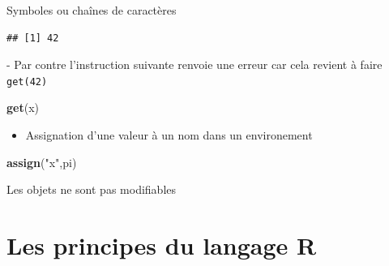 \documentclass[
  ignorenonframetext,
]{beamer}
\newenvironment{Shaded}{\begin{snugshade}}{\end{snugshade}}
\newcommand{\FunctionTok}[1]{\textcolor[rgb]{0.13,0.29,0.53}{\textbf{#1}}}
\newcommand{\NormalTok}[1]{#1}
\newcommand{\StringTok}[1]{\textcolor[rgb]{0.31,0.60,0.02}{#1}}
\providecommand{\tightlist}{%
  \setlength{\itemsep}{0pt}\setlength{\parskip}{0pt}}
\begin{document}
\begin{frame}[fragile]{Symboles ou chaînes de caractères}
\begin{verbatim}
## [1] 42
\end{verbatim}

\normalsize - Par contre l'instruction suivante renvoie une erreur car
cela revient à faire \texttt{get(42)}

\tiny

\begin{Shaded}
\begin{Highlighting}[]
\FunctionTok{get}\NormalTok{(x)}
\end{Highlighting}
\end{Shaded}

\normalsize

\begin{itemize}
\tightlist
\item
  Assignation d'une valeur à un nom dans un environement
\end{itemize}

\tiny

\begin{Shaded}
\begin{Highlighting}[]
\FunctionTok{assign}\NormalTok{(}\StringTok{"x"}\NormalTok{,pi)}
\end{Highlighting}
\end{Shaded}

\normalsize
\end{frame}

\begin{frame}{Les objets ne sont pas modifiables}
\protect\hypertarget{les-objets-ne-sont-pas-modifiables}{}
\end{frame}

\hypertarget{les-principes-du-langage-r}{%
\section{Les principes du langage R}\label{les-principes-du-langage-r}}
\end{document}
